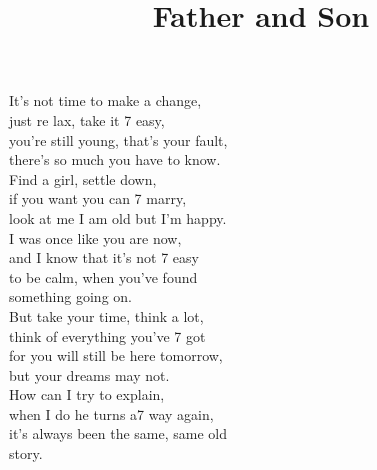 \title{Father and Son} 

It’s not  time to make a  change, \\ 
just re lax, take it 7 easy, \\ 
you’re still  young, that’s your  fault, \\ 
there’s so  much you have to  know. \\ 
Find a  girl, settle  down, \\ 
if you  want you can 7 marry, \\ 
look at  me I am  old but I’m  happy.  \\ 
I was  once like you are  now, \\ 
and I  know that it’s not 7 easy \\ 
to be  calm, when you’ve  found \\ 
something going  on.  \\ 
But take your  time, think a  lot, \\ 
think of  everything you’ve 7 got \\ 
for you will  still be here  tomorrow, \\ 
but your  dreams may not. \\ 
How can  I try to explain, \\ 
when I  do he turns a7 way again, \\ 
it’s  always been the  same, same old  \\ 
story. 

